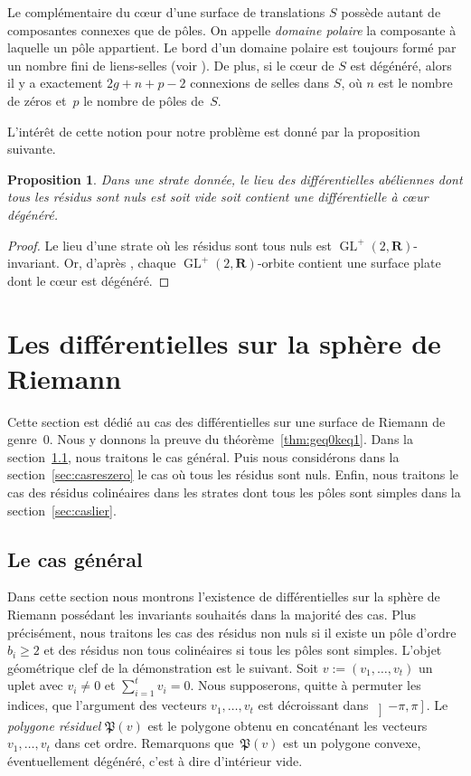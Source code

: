 \documentclass[JEP,XML,SOM,Unicode,francais,NoFloatCountersInSection,published]{cedram}
\DeclareMathOperator{\GL}{GL}
\newcommand{\RR}{\mathbf{R}}
\newtheorem{prop}[thm]{Proposition}
\theoremstyle{definition}
\begin{document}
Le complémentaire du cœur d'une surface de translations $S$ possède autant de composantes connexes que de pôles. On appelle \textit{domaine polaire} la composante à laquelle un pôle appartient. Le bord d'un domaine polaire est toujours formé par un nombre fini de liens-selles (voir \cite[Lem.\,2.1]{tahar}). De plus, si le cœur de $S$ est dégénéré, alors il y a exactement $2g+n+p-2$ connexions de selles dans $S$, où $n$ est le nombre de zéros et~$p$ le nombre de pôles de~$S$.

L'intérêt de cette notion pour notre problème est donné par la proposition suivante.
\begin{prop}\label{prop:coeurdege}
Dans une strate donnée, le lieu des différentielles abéliennes dont tous les résidus sont nuls est soit vide soit contient une différentielle à cœur dégénéré.
\end{prop}

\begin{proof}
Le lieu d'une strate où les résidus sont tous nuls est $\GL^{+}(2,\RR)$-invariant. Or, d'après \cite[Lem.\,2.2]{tahar}, chaque $\GL^{+}(2,\RR)$-orbite contient une surface plate dont le cœur est dégénéré.
\end{proof}

\section{Les différentielles sur la sphère de Riemann}
\label{sec:g0}

Cette section est dédié au cas des différentielles sur une surface de Riemann de genre~$0$. Nous y donnons la preuve du théorème~\ref{thm:geq0keq1}. Dans la section~\ref{sec:geng0}, nous traitons le cas général. Puis nous considérons dans la section~\ref{sec:casreszero} le cas où tous les résidus sont nuls. Enfin, nous traitons le cas des résidus colinéaires dans les strates dont tous les pôles sont simples dans la section~\ref{sec:caslier}.\enlargethispage{\baselineskip}%

\subsection{Le cas général}
\label{sec:geng0}
Dans cette section nous montrons l'existence de différentielles sur la sphère de Riemann possédant les invariants souhaités dans la majorité des cas. Plus précisément, nous traitons les cas des résidus non nuls si il existe un pôle d'ordre $b_{i}\geq2$ et des résidus non tous colinéaires si tous les pôles sont simples.
L'objet géométrique clef de la démonstration est le suivant. Soit $v:=(v_1,\ldots, v_{t})$ un uplet avec $v_{i}\neq 0$ et $\sum_{i=1}^{t}v_{i}=0$. Nous supposerons, quitte à permuter les indices, que l'argument des vecteurs $v_{1},\ldots,v_{t}$ est décroissant dans $\left]-\pi,\pi\right]$.
Le \emph{polygone résiduel } $\mathfrak{P}(v)$ est le polygone obtenu en concaténant les vecteurs $v_{1}, \ldots,v_{t}$ dans cet ordre. Remarquons que~$\mathfrak{P}(v)$ est un polygone convexe, éventuellement dégénéré, c'est à dire d'intérieur vide.
\end{document}
